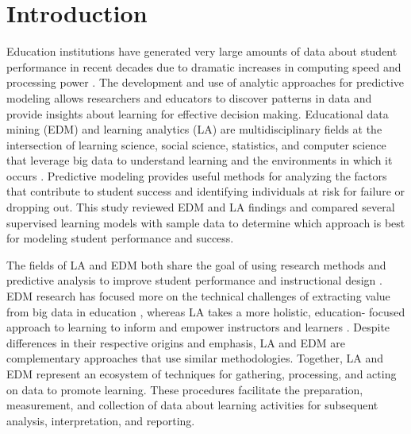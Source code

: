 \documentclass[sigconf]{acmart}
\begin{document}
\section{Introduction}

Education institutions have generated very large amounts of data about student 
performance in recent decades due to dramatic increases in computing speed 
and processing power \cite{daniel15, daniel16}. The development and use of 
analytic approaches for predictive modeling allows researchers and educators  
to discover patterns in data and provide insights about learning for effective 
decision making. Educational data mining (EDM) and learning analytics (LA) are 
multidisciplinary fields at the intersection of learning science, social science, 
statistics, and computer science that leverage big data to understand learning 
and the environments in which it occurs \cite{siemens13, siemensbaker12}. 
Predictive modeling provides useful methods for analyzing the factors that 
contribute to student success and identifying individuals at risk for failure
or dropping out. This study reviewed EDM and LA findings and compared several 
supervised learning models with sample data to determine which approach is 
best for modeling student performance and success. 


The fields of LA and EDM both share the goal of using research methods and
predictive analysis to improve student performance and instructional design 
\cite{baker09, ferguson12, lester19}. EDM research has focused more on the 
technical challenges of extracting value from big data in education 
\cite{penaAyala14, romero10}, whereas LA takes a more holistic, education-
focused approach to learning to inform and empower instructors and learners 
\cite{lang17, papamitsiou14}. Despite differences in their respective origins 
and emphasis, LA and EDM are complementary approaches that use similar 
methodologies. Together, LA and EDM represent an ecosystem of techniques for 
gathering, processing, and acting on data to promote learning. These procedures 
facilitate the preparation, measurement, and collection of data about learning 
activities for subsequent analysis, interpretation, and reporting. 

\end{document}
